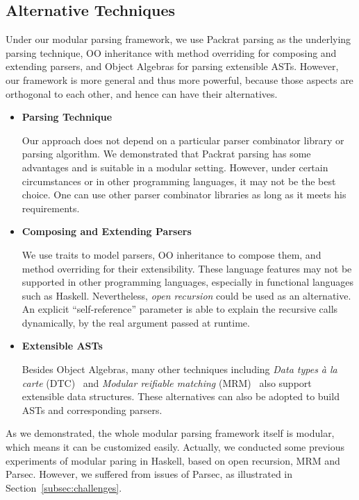 \subsection{Alternative Techniques}

Under our modular parsing framework, we use Packrat parsing as the underlying parsing technique, OO inheritance with method overriding for composing and extending parsers, and Object Algebras for parsing extensible ASTs. However, our framework is more general and thus more powerful, because those aspects are orthogonal to each other, and hence can have their alternatives.

\begin{itemize}

\item {\bf Parsing Technique}

Our approach does not depend on a particular parser combinator library or parsing algorithm. We demonstrated that Packrat parsing has some advantages and is suitable in a modular setting. However, under certain circumstances or in other programming languages, it may not be the best choice. One can use other parser combinator libraries as long as it meets his requirements.

\item {\bf Composing and Extending Parsers}

We use traits to model parsers, OO inheritance to compose them, and method overriding for their extensibility. These language features may not be supported in other programming languages, especially in functional languages such as Haskell. Nevertheless, \textit{open recursion} could be used as an alternative. An explicit ``self-reference'' parameter is able to explain the recursive calls dynamically, by the real argument passed at runtime.

\item {\bf Extensible ASTs}

Besides Object Algebras, many other techniques including \textit{Data types à la carte} (DTC)~\cite{swierstra2008data} and \textit{Modular reifiable matching} (MRM)~\cite{Oliveira2015} also support extensible data structures. These alternatives can also be adopted to build ASTs and corresponding parsers.

\end{itemize}

As we demonstrated, the whole modular parsing framework itself is modular, which means it can be customized easily. Actually, we conducted some previous experiments of modular paring in Haskell, based on open recursion, MRM and Parsec. However, we suffered from issues of Parsec, as illustrated in Section~\ref{subsec:challenges}.
